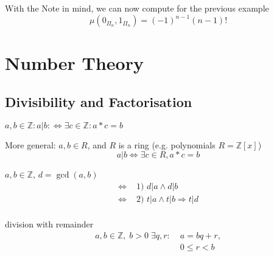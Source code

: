 With the Note in mind, we can now compute for the previous example
\[
    \mu( 0_{\Pi_n}, 1_{\Pi_n}) = (-1)^{n-1} (n-1)!
\]


\chapter{Number Theory}

\section{Divisibility and Factorisation}

\begin{definition}
$a,b \in \mathbb{Z}: a|b: \Leftrightarrow \exists c \in \mathbb{Z}: a * c = b$

More general: 
$a,b \in R$, and $R$ is a ring (e.g. polynomials $R = \mathbb{Z}[x]$)
\[
  a|b \Leftrightarrow \exists c \in R , a * c = b
\]
\end{definition}

\begin{definition}
$a,b \in \mathbb{Z}$, $d = \gcd(a,b)$
\begin{align*}
    \Leftrightarrow & \text{ 1) } d|a \wedge d|b \\
    \Leftrightarrow & \text{ 2) } t|a \wedge t|b \Rightarrow t|d \\
\end{align*}
\end{definition}

\begin{definition}
division with remainder
\begin{align*}
  a,b \in \mathbb{Z}, \; 
  b > 0 \;\exists q,r: 
    & \; a = b q  + r, \\ 
    & \; 0 \leq r < b
\end{align*}
\end{definition}



